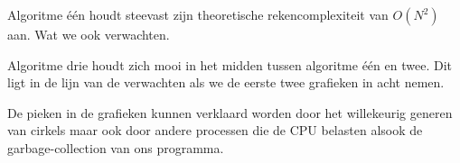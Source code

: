 \documentclass[11pt,a4paper]{article}
\begin{document}
Algoritme \'e\'en houdt steevast zijn theoretische rekencomplexiteit van $O(N^{2})$ aan. Wat we ook verwachten.

Algoritme drie houdt zich mooi in het midden tussen algoritme \'e\'en en twee. Dit ligt in de lijn van de verwachten als we de eerste twee grafieken in acht nemen.

De pieken in de grafieken kunnen verklaard worden door het willekeurig generen van cirkels maar ook door andere processen die de CPU belasten alsook de garbage-collection van ons programma. 
\end{document}
